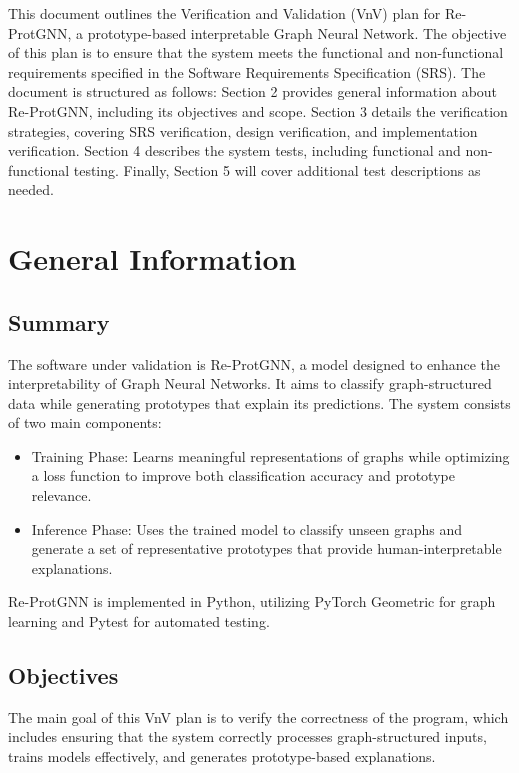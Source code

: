 \documentclass[12pt, titlepage]{article}
\begin{document}

This document outlines the Verification and Validation (VnV) plan for Re-ProtGNN, a prototype-based interpretable Graph Neural Network. The objective of this plan is to ensure that the system meets the functional and non-functional requirements specified in the Software Requirements Specification (SRS). The document is structured as follows: Section 2 provides general information about Re-ProtGNN, including its objectives and scope. Section 3 details the verification strategies, covering SRS verification, design verification, and implementation verification. Section 4 describes the system tests, including functional and non-functional testing. Finally, Section 5 will cover additional test descriptions as needed.

\section{General Information}

\subsection{Summary}

The software under validation is Re-ProtGNN, a model designed to enhance the interpretability of Graph Neural Networks. It aims to classify graph-structured data while generating prototypes that explain its predictions. The system consists of two main components:

\begin{itemize}
    \item Training Phase: Learns meaningful representations of graphs while optimizing a loss function to improve both classification accuracy and prototype relevance.
    \item Inference Phase: Uses the trained model to classify unseen graphs and generate a set of representative prototypes that provide human-interpretable explanations.
\end{itemize}

Re-ProtGNN is implemented in Python, utilizing PyTorch Geometric for graph learning and Pytest for automated testing.


\subsection{Objectives}

The main goal of this VnV plan is to verify the correctness of the program, which includes ensuring that the system correctly processes graph-structured inputs, trains models effectively, and generates prototype-based explanations.
\end{document}
